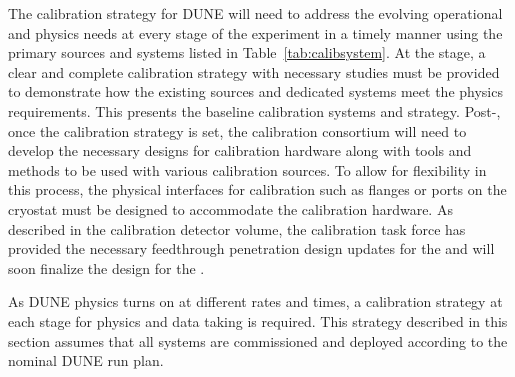 The calibration strategy for DUNE will need to address the evolving operational and physics needs at every stage of the experiment in a timely manner using the primary sources and systems listed in Table~\ref{tab:calibsystem}. 
At the  stage, a clear and complete calibration strategy with necessary studies must be provided to demonstrate how the existing sources and dedicated systems meet the physics requirements.  
This  presents the baseline calibration systems and strategy. Post-, once the calibration strategy is set, the calibration consortium will need to develop the necessary designs for calibration hardware along with tools and methods to be used with various calibration sources. 
To allow for flexibility in this process, the physical interfaces for calibration such as flanges or ports on the cryostat must be designed to accommodate the calibration hardware. As described in the calibration  detector volume, the calibration task force has provided the necessary feedthrough penetration design updates for the  and will soon finalize the design for the . 

As DUNE physics turns on at different rates and times, a calibration strategy at each stage for physics and data taking is required. This strategy described in this section assumes that all systems are commissioned and deployed according to the nominal DUNE run plan.

